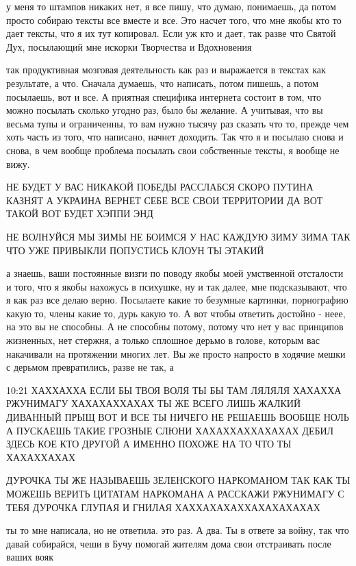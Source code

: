 у меня то штампов никаких нет, я все пишу, что думаю, понимаешь, да потом
просто собираю тексты все вместе и все. Это насчет того, что мне якобы кто то
дает тексты, что я их тут копировал. Если уж кто и дает, так разве что Святой
Дух, посылающий мне искорки Творчества и Вдохновения

так продуктивная мозговая деятельность как раз и выражается в текстах как
результате, а что. Сначала думаешь, что написать, потом пишешь, а потом
посылаешь, вот и все. А приятная специфика интернета состоит в том, что можно
посылать сколько угодно раз, было бы желание. А учитывая, что вы весьма тупы и
ограниченны, то вам нужно тысячу раз сказать что то, прежде чем хоть часть из
того, что написано, начнет доходить. Так что я и посылаю снова и снова, в чем
вообще проблема посылать свои собственные тексты, я вообще не вижу.

НЕ БУДЕТ У ВАС НИКАКОЙ ПОБЕДЫ РАССЛАБСЯ СКОРО ПУТИНА КАЗНЯТ А УКРАИНА ВЕРНЕТ
СЕБЕ ВСЕ СВОИ ТЕРРИТОРИИ ДА ВОТ ТАКОЙ ВОТ БУДЕТ ХЭППИ ЭНД

НЕ ВОЛНУЙСЯ МЫ ЗИМЫ НЕ БОИМСЯ У НАС КАЖДУЮ ЗИМУ ЗИМА ТАК ЧТО УЖЕ ПРИВЫКЛИ
ПОПУСТИСЬ КЛОУН ТЫ ЭТАКИЙ

а знаешь, ваши постоянные визги по поводу якобы моей умственной отсталости и
того, что я якобы нахожусь в психушке, ну и так далее, мне подсказывают, что я
как раз все делаю верно. Посылаете какие то безумные картинки, порнографию
какую то, члены какие то, дурь какую то. А вот чтобы ответить достойно - неее,
на это вы не способны. А не способны потому, потому что нет у вас принципов
жизненных, нет стержня, а только сплошное дерьмо в голове, которым вас
накачивали на протяжении многих лет. Вы же просто напросто в ходячие мешки с
дерьмом превратились, разве не так, а

10:21
ХАХХАХХА ЕСЛИ БЫ ТВОЯ ВОЛЯ ТЫ БЫ ТАМ ЛЯЛЯЛЯ ХАХАХХА РЖУНИМАГУ ХАХАХАХХАХАХ ТЫ
ЖЕ ВСЕГО ЛИШЬ ЖАЛКИЙ ДИВАННЫЙ ПРЫЩ ВОТ И ВСЕ ТЫ НИЧЕГО НЕ РЕШАЕШЬ ВООБЩЕ НОЛЬ А
ПУСКАЕШЬ ТАКИЕ ГРОЗНЫЕ СЛЮНИ ХАХАХХАХХАХАХАХ ДЕБИЛ ЗДЕСЬ КОЕ КТО ДРУГОЙ А
ИМЕННО ПОХОЖЕ НА ТО ЧТО ТЫ ХАХАХХАХАХ

ДУРОЧКА ТЫ ЖЕ НАЗЫВАЕШЬ ЗЕЛЕНСКОГО НАРКОМАНОМ ТАК КАК ТЫ МОЖЕШЬ ВЕРИТЬ ЦИТАТАМ
НАРКОМАНА А РАССКАЖИ РЖУНИМАГУ С ТЕБЯ ДУРОЧКА ГЛУПАЯ И ГНИЛАЯ
ХАХХАХАХАХХАХАХАХАХАХ


ты то мне написала, но не ответила. это раз. А два. Ты в ответе за войну, так
что давай собирайся, чеши в Бучу помогай жителям дома свои отстраивать после
ваших вояк

